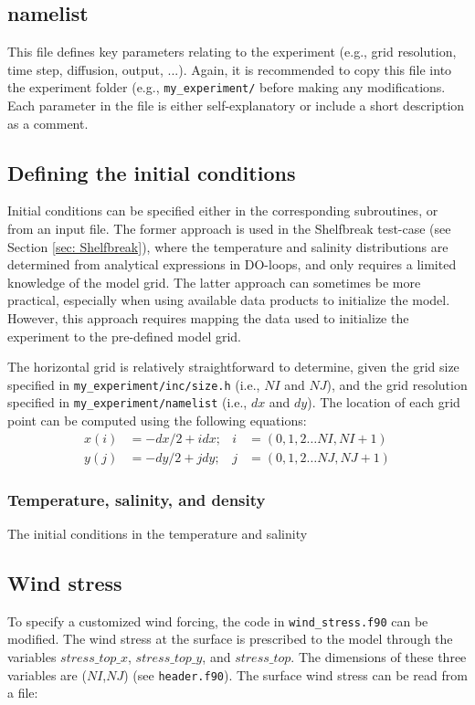 \documentclass[12pt,letterpaper,titlepage]{article}
\begin{document}
\subsection{namelist}
This file defines key parameters relating to the experiment (e.g., grid resolution, time step, diffusion, output, ...). Again, it is recommended to copy this file into the experiment folder (e.g., \texttt{my\_experiment/} before making any modifications. Each parameter in the file is either self-explanatory or include a short description as a comment.

\subsection{Defining the initial conditions}
Initial conditions can be specified either in the corresponding subroutines, or from an input file. The former approach is used in the Shelfbreak test-case (see Section \ref{sec: Shelfbreak}), where the temperature and salinity distributions are determined from analytical expressions in DO-loops, and only requires a limited knowledge of the model grid. The latter approach can sometimes be more practical, especially when using available data products to initialize the model. However, this approach requires mapping the data used to initialize the experiment to the pre-defined model grid. 

The horizontal grid is relatively straightforward to determine, given the grid size specified in \texttt{my\_experiment/inc/size.h} (i.e., $NI$ and $NJ$), and the grid resolution specified in \texttt{my\_experiment/namelist} (i.e., $dx$ and $dy$). The location of each grid point can be computed using the following equations:
\begin{align}
x(i) &= -dx/2 + i dx; &i &= (0, 1 , 2 \ldots NI, NI+1)\\
y(j) &= -dy/2 + j dy; &j &= (0, 1 , 2 \ldots NJ, NJ+1)
\end{align}

\subsubsection{Temperature, salinity, and density}
The initial conditions in the temperature and salinity

\subsection{Wind stress}
To specify a customized wind forcing, the code in \texttt{wind\_stress.f90} can be modified. The wind stress at the surface is prescribed to the model through the variables $stress\_top\_x$, $stress\_top\_y$, and $stress\_top$. The dimensions of these three variables are ($NI$,$NJ$) (see \texttt{header.f90}). The surface wind stress can be read from a file: 
\end{document}
